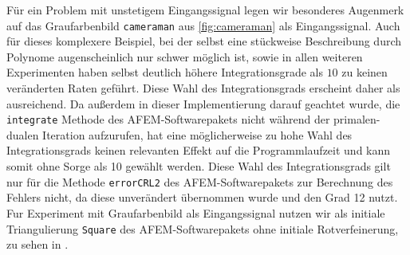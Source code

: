 Für ein Problem mit unstetigem Eingangssignal legen wir besonderes
Augenmerk auf das Graufarbenbild \texttt{cameraman} aus \cref{fig:cameraman}
als Eingangssignal. 
Auch für dieses komplexere Beispiel, bei der selbst eine stückweise
Beschreibung durch Polynome augenscheinlich nur schwer möglich ist, sowie in
allen weiteren Experimenten haben selbst deutlich höhere Integrationsgrade als
$10$ zu keinen veränderten Raten geführt. 
Diese Wahl des Integrationsgrads erscheint daher als ausreichend.
Da außerdem in dieser Implementierung darauf geachtet wurde, die
\texttt{integrate} Methode des AFEM-Softwarepakets \cite{Car09} nicht während
der primalen-dualen Iteration aufzurufen, hat eine möglicherweise zu hohe Wahl
des Integrationsgrads keinen relevanten Effekt auf die Programmlaufzeit und
kann somit ohne Sorge als 10 gewählt werden.
Diese Wahl des Integrationsgrads gilt nur für die Methode \texttt{errorCRL2}
des AFEM-Softwarepakets zur Berechnung des Fehlers nicht, da diese unverändert
übernommen wurde und den Grad 12 nutzt.
Fur Experiment mit Graufarbenbild als Eingangssignal nutzen wir als initiale
Triangulierung \texttt{Square} des AFEM-Softwarepakets ohne initiale
Rotverfeinerung, zu sehen in .

